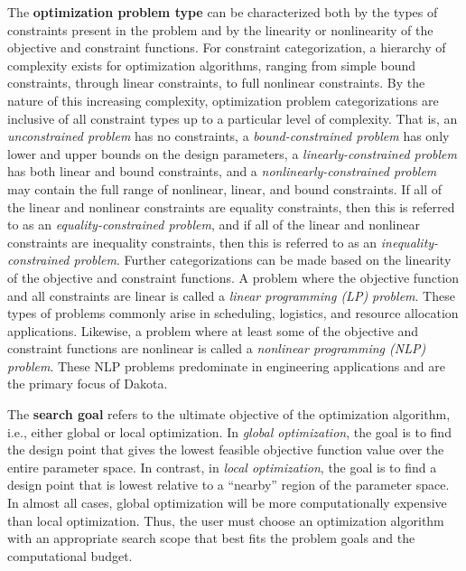 The {\bf optimization problem type} can be characterized both by
the types of constraints present in the problem and by the linearity
or nonlinearity of the objective and constraint functions. For
constraint categorization, a hierarchy of complexity exists for
optimization algorithms, ranging from simple bound constraints,
through linear constraints, to full nonlinear constraints. By the
nature of this increasing complexity, optimization problem
categorizations are inclusive of all constraint types up to a
particular level of complexity. That is, an \emph{unconstrained
  problem} has no constraints, a \emph{bound-constrained problem} has
only lower and upper bounds on the design parameters, a
\emph{linearly-constrained problem} has both linear and bound
constraints, and a \emph{nonlinearly-constrained problem} may contain
the full range of nonlinear, linear, and bound constraints. If all of
the linear and nonlinear constraints are equality constraints, then
this is referred to as an \emph{equality-constrained problem}, and if
all of the linear and nonlinear constraints are inequality
constraints, then this is referred to as an
\emph{inequality-constrained problem}. Further categorizations can be
made based on the linearity of the objective and constraint functions.
A problem where the objective function and all constraints are linear
is called a \emph{linear programming (LP) problem}. These types of
problems commonly arise in scheduling, logistics, and resource
allocation applications. Likewise, a problem where at least some of
the objective and constraint functions are nonlinear is called a
\emph{nonlinear programming (NLP) problem}. These NLP problems
predominate in engineering applications and are the primary focus of
Dakota.

The {\bf search goal} refers to the ultimate objective of the
optimization algorithm, i.e., either global or local optimization. In
\emph{global optimization}, the goal is to find the design point that
gives the lowest feasible objective function value over the entire
parameter space. In contrast, in \emph{local optimization}, the goal
is to find a design point that is lowest relative to a ``nearby''
region of the parameter space. In almost all cases, global
optimization will be more computationally expensive than local
optimization. Thus, the user must choose an optimization algorithm
with an appropriate search scope that best fits the problem goals and
the computational budget.


